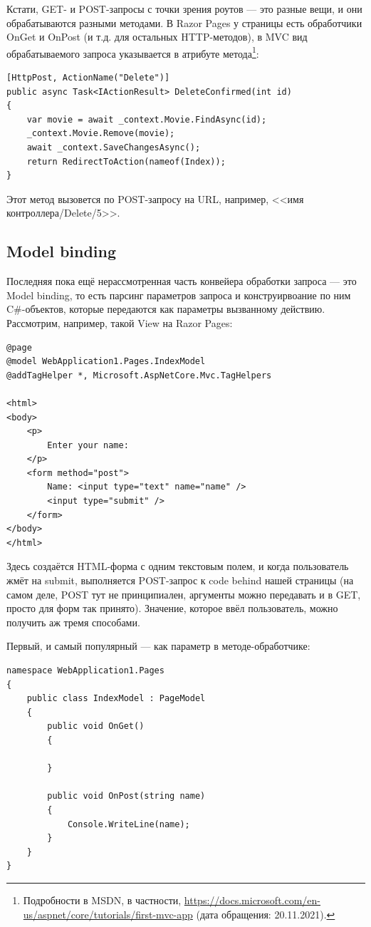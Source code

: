 \documentclass{../../text-style}
\begin{document}
Кстати, GET- и POST-запросы с точки зрения роутов --- это разные вещи, и они обрабатываются разными методами. В Razor Pages у страницы есть обработчики OnGet и OnPost (и т.д. для остальных HTTP-методов), в MVC вид обрабатываемого запроса указывается в атрибуте метода\footnote{Подробности в MSDN, в частности, \url{https://docs.microsoft.com/en-us/aspnet/core/tutorials/first-mvc-app} (дата обращения: 20.11.2021).}:

\begin{verbatim}
[HttpPost, ActionName("Delete")]
public async Task<IActionResult> DeleteConfirmed(int id)
{
    var movie = await _context.Movie.FindAsync(id);
    _context.Movie.Remove(movie);
    await _context.SaveChangesAsync();
    return RedirectToAction(nameof(Index));
}
\end{verbatim}

Этот метод вызовется по POST-запросу на URL, например, <<имя контроллера/Delete/5>>.

\subsection{Model binding}

Последняя пока ещё нерассмотренная часть конвейера обработки запроса --- это Model binding, то есть парсинг параметров запроса и конструирвоание по ним C\#-объектов, которые передаются как параметры вызванному действию. Рассмотрим, например, такой View на Razor Pages:

\begin{verbatim}
@page
@model WebApplication1.Pages.IndexModel
@addTagHelper *, Microsoft.AspNetCore.Mvc.TagHelpers

<html>
<body>
    <p>
        Enter your name:
    </p>
    <form method="post">
        Name: <input type="text" name="name" />
        <input type="submit" />
    </form>
</body>
</html>
\end{verbatim}

Здесь создаётся HTML-форма с одним текстовым полем, и когда пользователь жмёт на submit, выполняется POST-запрос к code behind нашей страницы (на самом деле, POST тут не принципиален, аргументы можно передавать и в GET, просто для форм так принято). Значение, которое ввёл пользователь, можно получить аж тремя способами.

Первый, и самый популярный --- как параметр в методе-обработчике:

\begin{verbatim}
namespace WebApplication1.Pages
{
    public class IndexModel : PageModel
    {
        public void OnGet()
        {

        }

        public void OnPost(string name)
        {
            Console.WriteLine(name);
        }
    }
}
\end{verbatim}
\end{document}
